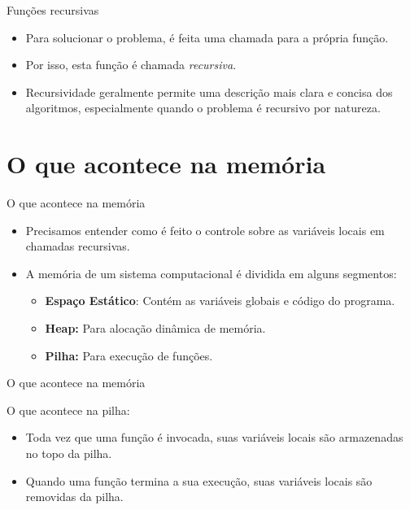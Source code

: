 \documentclass[handout]{beamer}
\begin{document}
\begin{frame}[fragile]{Funções recursivas}
    \begin{itemize}[<+->]
        \item Para solucionar o problema, é feita uma chamada para a própria função.
        \item Por isso, esta função é chamada {\it recursiva}.
        \item Recursividade geralmente permite uma descrição mais clara e concisa dos algoritmos, especialmente quando o problema é recursivo por natureza.
    \end{itemize}
\end{frame}


\section{O que acontece na memória}

\begin{frame}[fragile]{O que acontece na memória}

    \begin{itemize}[<+->]
        \item Precisamos entender como é feito o controle sobre as variáveis locais em chamadas recursivas.
        \item A memória de um sistema computacional é dividida em alguns segmentos:
        \begin{itemize}
            \item {\bf Espaço Estático}: Contém as variáveis globais e código do programa.
            \item {\bf Heap:} Para alocação dinâmica de memória.
            \item {\bf Pilha:} Para execução de funções.
        \end{itemize}
    \end{itemize}
\end{frame}

\begin{frame}[fragile]{O que acontece na memória}

    O que acontece na pilha:
    \begin{itemize}
        \item Toda vez que uma função é invocada, suas variáveis locais são armazenadas no topo da pilha.
        \item Quando uma função termina a sua execução, suas variáveis locais são removidas da pilha.
    \end{itemize}
\end{frame}
\end{document}
